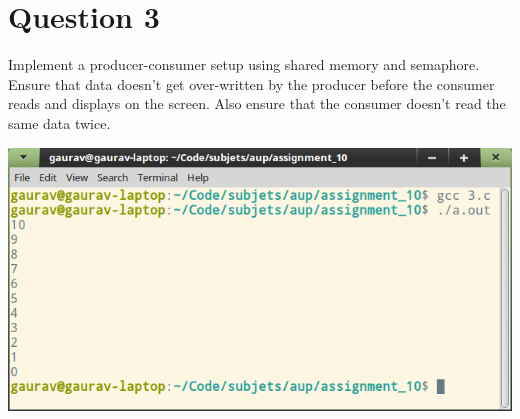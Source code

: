 \documentclass[main.tex]{subfiles}
\begin{document}
\section{Question 3}
Implement a producer-consumer setup using shared memory and semaphore. Ensure
that data doesn’t get over-written by the producer before the consumer reads and
displays on the screen. Also ensure that the consumer doesn’t read the same data
twice.


\includegraphics[width=\textwidth]{figures/3_output.png}
\end{document}
